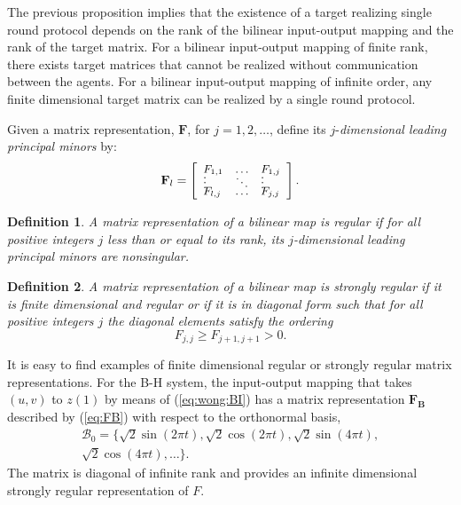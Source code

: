 \documentclass[12pt,onecolumn,draftcls]{IEEEtran}
\newcommand{\bB}{\mathbf{B}}
\newtheorem{definition}{Definition}[section]
\begin{document}
\vspace{.5cm}

The previous proposition implies that the existence of a target realizing single round protocol
depends on the rank of the bilinear input-output mapping and the rank of the target matrix.  
For a bilinear input-output mapping of finite rank,
there exists target matrices that cannot be realized without communication between the agents.
For a bilinear input-output mapping of infinite order, any finite dimensional target matrix can be
realized by a single round protocol.   

Given a matrix representation, $\mathbf{F}$, for $j=1,2, \ldots$,
define its $j$-{\em dimensional leading principal minors} by:
\begin{equation}
\mathbf{F}_l=\left[
\small
\begin{array}{llll}
F_{1,1} &  \ldots & F_{1,j} \vspace{-0.2cm}\\
\vdots & \ddots & \vdots \vspace{-0.2cm}\\
F_{l,j} & \ldots & F_{j,j}
\end{array}
\right].
\label{eq:JB:Leading}
\end{equation}

\begin{definition}
A matrix representation of a bilinear map is {\it regular} if 
for all positive integers $j$ less than or equal to its rank, its $j$-dimensional leading principal minors are nonsingular.
\end{definition}

\begin{definition}
A matrix representation of a bilinear map is {\it strongly regular} if it is finite
dimensional and regular or if it is in
diagonal form such that for all positive integers $j$
the diagonal elements satisfy the ordering
\begin{equation}
F_{j,j} \geq F_{j+1,j+1} > 0.
\label{eq:strongreg}
\end{equation}
\end{definition}
It is easy to find examples of finite dimensional regular or strongly regular
matrix representations.  For the B-H system, the input-output mapping that takes $(u,v)$ to $z(1)$ by means of
(\ref{eq:wong:BI}) has a matrix representation $\mathbf{F}_\bB$ described by (\ref{eq:FB})
with respect to the orthonormal basis,
\begin{align}
\mathcal{B}_0 = \{\sqrt{2} \sin(2\pi t), \sqrt{2}\cos(2\pi t),\sqrt{2}\sin(4\pi t), \nonumber\\
\sqrt{2}\cos(4\pi t), \ldots \}.
\label{eq:JB:OurBasis}
\end{align}
The matrix is diagonal of infinite rank and provides an infinite dimensional strongly regular representation of $F$.  
\end{document}
